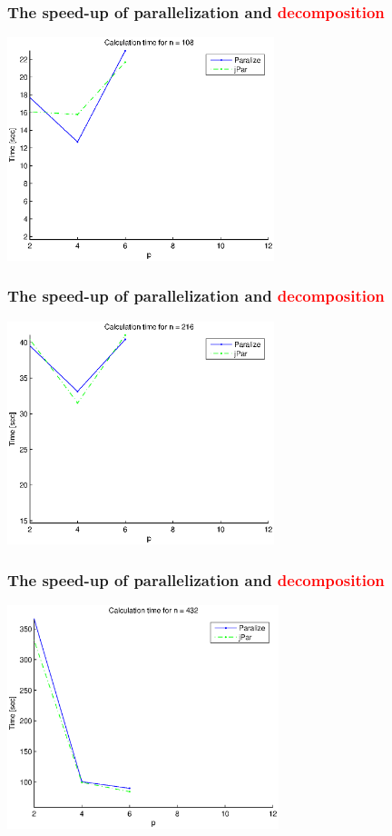 \documentclass{beamer}
\begin{document}
\begin{frame}
   \frametitle{The speed-up of parallelization and \textcolor{red}{decomposition}}
   \centering
   \includegraphics[height=6.5cm]{fig1}
\end{frame}
\begin{frame}
   \frametitle{The speed-up of parallelization and \textcolor{red}{decomposition}}
   \centering
   \includegraphics[height=6.5cm]{fig2}
\end{frame}
\begin{frame}
   \frametitle{The speed-up of parallelization and \textcolor{red}{decomposition}}
   \centering
   \includegraphics[height=6.5cm]{fig3}
\end{frame}
\end{document}
